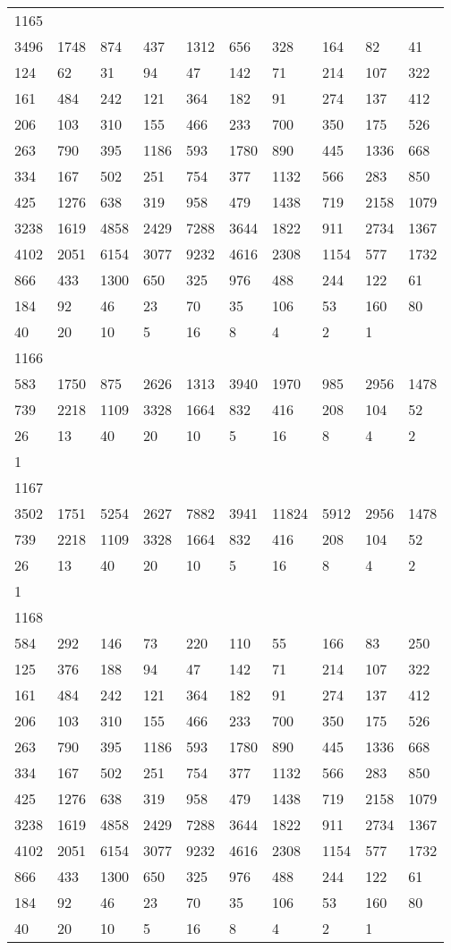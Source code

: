 \begin{longtable}{*{10}{l}}
1165&&&&&&&&&\\
3496& 1748& 874& 437& 1312& 656& 328& 164& 82& 41\\
124& 62& 31& 94& 47& 142& 71& 214& 107& 322\\
161& 484& 242& 121& 364& 182& 91& 274& 137& 412\\
206& 103& 310& 155& 466& 233& 700& 350& 175& 526\\
263& 790& 395& 1186& 593& 1780& 890& 445& 1336& 668\\
334& 167& 502& 251& 754& 377& 1132& 566& 283& 850\\
425& 1276& 638& 319& 958& 479& 1438& 719& 2158& 1079\\
3238& 1619& 4858& 2429& 7288& 3644& 1822& 911& 2734& 1367\\
4102& 2051& 6154& 3077& 9232& 4616& 2308& 1154& 577& 1732\\
866& 433& 1300& 650& 325& 976& 488& 244& 122& 61\\
184& 92& 46& 23& 70& 35& 106& 53& 160& 80\\
40& 20& 10& 5& 16& 8& 4& 2& 1& \\

1166&&&&&&&&&\\
583& 1750& 875& 2626& 1313& 3940& 1970& 985& 2956& 1478\\
739& 2218& 1109& 3328& 1664& 832& 416& 208& 104& 52\\
26& 13& 40& 20& 10& 5& 16& 8& 4& 2\\
1& \\

1167&&&&&&&&&\\
3502& 1751& 5254& 2627& 7882& 3941& 11824& 5912& 2956& 1478\\
739& 2218& 1109& 3328& 1664& 832& 416& 208& 104& 52\\
26& 13& 40& 20& 10& 5& 16& 8& 4& 2\\
1& \\

1168&&&&&&&&&\\
584& 292& 146& 73& 220& 110& 55& 166& 83& 250\\
125& 376& 188& 94& 47& 142& 71& 214& 107& 322\\
161& 484& 242& 121& 364& 182& 91& 274& 137& 412\\
206& 103& 310& 155& 466& 233& 700& 350& 175& 526\\
263& 790& 395& 1186& 593& 1780& 890& 445& 1336& 668\\
334& 167& 502& 251& 754& 377& 1132& 566& 283& 850\\
425& 1276& 638& 319& 958& 479& 1438& 719& 2158& 1079\\
3238& 1619& 4858& 2429& 7288& 3644& 1822& 911& 2734& 1367\\
4102& 2051& 6154& 3077& 9232& 4616& 2308& 1154& 577& 1732\\
866& 433& 1300& 650& 325& 976& 488& 244& 122& 61\\
184& 92& 46& 23& 70& 35& 106& 53& 160& 80\\
40& 20& 10& 5& 16& 8& 4& 2& 1& \\


\end{longtable}
